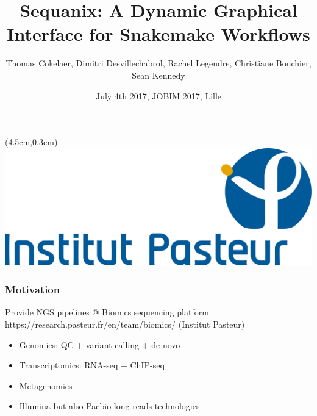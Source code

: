 \documentclass{beamer}
\title[Sequana]{Sequanix: A Dynamic Graphical Interface for Snakemake Workflows}
\author[T. Cokelaer]{Thomas Cokelaer, Dimitri Desvillechabrol, Rachel Legendre, 
Christiane Bouchier, Sean Kennedy}
\institute{Institut Pasteur, Paris}
\date{July 4th 2017, JOBIM 2017, Lille}
\begin{document}

\begin{frame}[plain]
    \titlepage
    \begin{textblock*}{5cm}(4.5cm,0.3cm)
        \includegraphics[scale=0.09]{images/Institut_Pasteur.png}
    \end{textblock*}
\end{frame}







\begin{frame}
\frametitle{Motivation}
\begin{block}{Provide NGS pipelines @ Biomics sequencing platform 
https://research.pasteur.fr/en/team/biomics/ (Institut Pasteur)}
 \begin{itemize}
  \item Genomics: QC + variant calling + de-novo
  \item Transcriptomics: RNA-seq + ChIP-seq 
  \item Metagenomics
  \item Illumina but also Pacbio long reads technologies
 \end{itemize}
\end{block} 
\end{frame}

\usebackgroundtemplate{}
\end{document}
